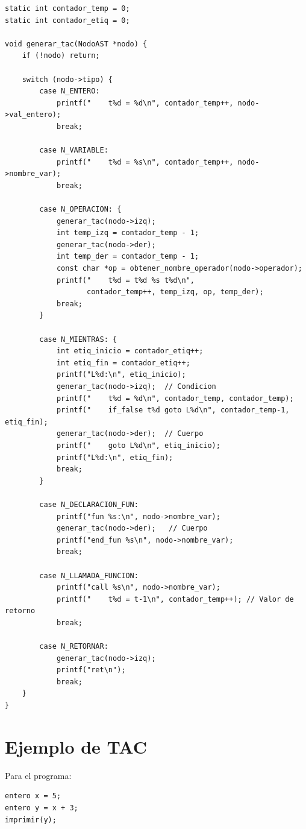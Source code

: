 \begin{lstlisting}[style=cstyle, caption={Generación de TAC recursiva en ir.c}]
static int contador_temp = 0;
static int contador_etiq = 0;

void generar_tac(NodoAST *nodo) {
    if (!nodo) return;

    switch (nodo->tipo) {
        case N_ENTERO:
            printf("    t%d = %d\n", contador_temp++, nodo->val_entero);
            break;

        case N_VARIABLE:
            printf("    t%d = %s\n", contador_temp++, nodo->nombre_var);
            break;

        case N_OPERACION: {
            generar_tac(nodo->izq);
            int temp_izq = contador_temp - 1;
            generar_tac(nodo->der);
            int temp_der = contador_temp - 1;
            const char *op = obtener_nombre_operador(nodo->operador);
            printf("    t%d = t%d %s t%d\n", 
                   contador_temp++, temp_izq, op, temp_der);
            break;
        }

        case N_MIENTRAS: {
            int etiq_inicio = contador_etiq++;
            int etiq_fin = contador_etiq++;
            printf("L%d:\n", etiq_inicio);
            generar_tac(nodo->izq);  // Condicion
            printf("    t%d = %d\n", contador_temp, contador_temp);
            printf("    if_false t%d goto L%d\n", contador_temp-1, etiq_fin);
            generar_tac(nodo->der);  // Cuerpo
            printf("    goto L%d\n", etiq_inicio);
            printf("L%d:\n", etiq_fin);
            break;
        }

        case N_DECLARACION_FUN:
            printf("fun %s:\n", nodo->nombre_var);
            generar_tac(nodo->der);   // Cuerpo
            printf("end_fun %s\n", nodo->nombre_var);
            break;

        case N_LLAMADA_FUNCION:
            printf("call %s\n", nodo->nombre_var);
            printf("    t%d = t-1\n", contador_temp++); // Valor de retorno
            break;

        case N_RETORNAR:
            generar_tac(nodo->izq);
            printf("ret\n");
            break;
    }
}
\end{lstlisting}

\section{Ejemplo de TAC}

Para el programa:
\begin{lstlisting}[style=tppstyle]
entero x = 5;
entero y = x + 3;
imprimir(y);
\end{lstlisting}

